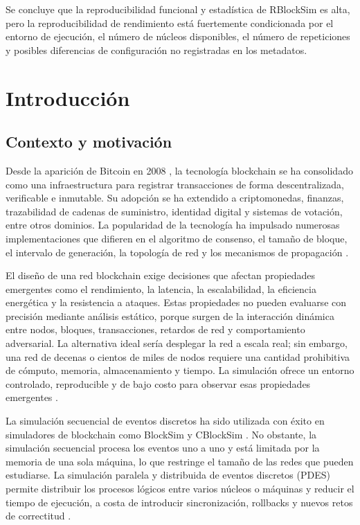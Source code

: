 \documentclass[11pt,a4paper,oneside]{article}
\begin{document}
Se concluye que la reproducibilidad funcional y estadística de RBlockSim es alta, pero la reproducibilidad de rendimiento está fuertemente condicionada por el entorno de ejecución, el número de núcleos disponibles, el número de repeticiones y posibles diferencias de configuración no registradas en los metadatos.

\clearpage

\section{Introducción}

\subsection{Contexto y motivación}

Desde la aparición de Bitcoin en 2008 \cite{nakamoto2008bitcoin}, la tecnología blockchain se ha consolidado como una infraestructura para registrar transacciones de forma descentralizada, verificable e inmutable. Su adopción se ha extendido a criptomonedas, finanzas, trazabilidad de cadenas de suministro, identidad digital y sistemas de votación, entre otros dominios. La popularidad de la tecnología ha impulsado numerosas implementaciones que difieren en el algoritmo de consenso, el tamaño de bloque, el intervalo de generación, la topología de red y los mecanismos de propagación \cite{albshri2022simulators,paulavicius2021review}.

El diseño de una red blockchain exige decisiones que afectan propiedades emergentes como el rendimiento, la latencia, la escalabilidad, la eficiencia energética y la resistencia a ataques. Estas propiedades no pueden evaluarse con precisión mediante análisis estático, porque surgen de la interacción dinámica entre nodos, bloques, transacciones, retardos de red y comportamiento adversarial. La alternativa ideal sería desplegar la red a escala real; sin embargo, una red de decenas o cientos de miles de nodos requiere una cantidad prohibitiva de cómputo, memoria, almacenamiento y tiempo. La simulación ofrece un entorno controlado, reproducible y de bajo costo para observar esas propiedades emergentes \cite{pimpini2025rblocksim}.

La simulación secuencial de eventos discretos ha sido utilizada con éxito en simuladores de blockchain como BlockSim \cite{alharby2020blocksim,faria2019blocksim} y CBlockSim \cite{ma2022cblocksim}. No obstante, la simulación secuencial procesa los eventos uno a uno y está limitada por la memoria de una sola máquina, lo que restringe el tamaño de las redes que pueden estudiarse. La simulación paralela y distribuida de eventos discretos (PDES) permite distribuir los procesos lógicos entre varios núcleos o máquinas y reducir el tiempo de ejecución, a costa de introducir sincronización, rollbacks y nuevos retos de correctitud \cite{fujimoto1990pdes}.
\end{document}
